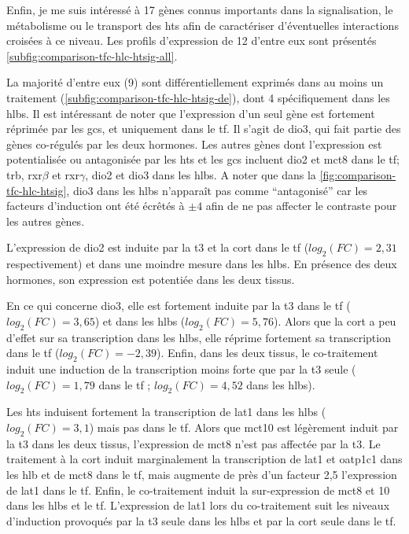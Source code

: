\documentclass[../main.tex]{subfiles}
\begin{document}
	Enfin, je me suis intéressé à 17 gènes connus importants dans la signalisation, le métabolisme ou le transport des \glspl{ht} afin de caractériser d'éventuelles interactions croisées à ce niveau.
	Les profils d'expression de 12 d'entre eux sont présentés \autoref{subfig:comparison-tfc-hlc-htsig-all}.

	

	La majorité d'entre eux (9) sont différentiellement exprimés dans au moins un traitement (\autoref{subfig:comparison-tfc-hlc-htsig-de}), dont 4 spécifiquement dans les \glspl{hlb}.
	Il est intéressant de noter que l'expression d'un seul gène est fortement réprimée par les \glspl{gc}, et uniquement dans le \gls{tf}.
	Il s'agit de \gls{dio3}, qui fait partie des gènes co-régulés par les deux hormones.
	Les autres gènes dont l'expression est potentialisée ou antagonisée par les \glspl{ht} et les \glspl{gc} incluent \gls{dio2} et \gls{mct}8 dans le \gls{tf}; \gls{trb}, \gls{rxr}$\beta$ et \gls{rxr}$\gamma$, \gls{dio2} et \gls{dio3} dans les \glspl{hlb}.
	A noter que dans la \autoref{fig:comparison-tfc-hlc-htsig}, \gls{dio3} dans les \glspl{hlb} n’apparaît pas comme ``antagonisé'' car les facteurs d'induction ont été écrêtés à $\pm 4$ afin de ne pas affecter le contraste pour les autres gènes.
	\par
	L'expression de \gls{dio2} est induite par la \gls{t3} et la \gls{cort} dans le \gls{tf} ($log_2(FC)=2,31$ respectivement) et dans une moindre mesure dans les \glspl{hlb}.
	En présence des deux hormones, son expression est potentiée dans les deux tissus.
	\par
	En ce qui concerne \gls{dio3}, elle est fortement induite par la \gls{t3} dans le \gls{tf} ($log_2(FC)=3,65$) et dans les \glspl{hlb} ($log_2(FC)=5,76$).
	Alors que la \gls{cort} a peu d'effet sur sa transcription dans les \glspl{hlb}, elle réprime fortement sa transcription dans le \gls{tf} ($log_2(FC)=-2,39$).
	Enfin, dans les deux tissus, le co-traitement induit une induction de la transcription moins forte que par la \gls{t3} seule ($log_2(FC)=1,79$ dans le \gls{tf} ; $log_2(FC)=4,52$ dans les \glspl{hlb}).
	\par
	Les \glspl{ht} induisent fortement la transcription de \gls{lat}1 dans les \glspl{hlb} ($log_2(FC)=3,1$) mais pas dans le \gls{tf}.
	Alors que \gls{mct}10 est légèrement induit par la \gls{t3} dans les deux tissus, l'expression de \gls{mct}8 n'est pas affectée par la \gls{t3}.
	Le traitement à la \gls{cort} induit marginalement la transcription de \gls{lat}1 et \gls{oatp}1c1 dans les \gls{hlb} et de \gls{mct}8 dans le \gls{tf}, mais augmente de près d'un facteur 2,5 l'expression de \gls{lat}1 dans le \gls{tf}.
	Enfin, le co-traitement induit la sur-expression de \gls{mct}8 et 10 dans les \glspl{hlb} et le \gls{tf}.
	L'expression de \gls{lat}1 lors du co-traitement suit les niveaux d'induction provoqués par la \gls{t3} seule dans les \glspl{hlb} et par la \gls{cort} seule dans le \gls{tf}.

\end{document}
